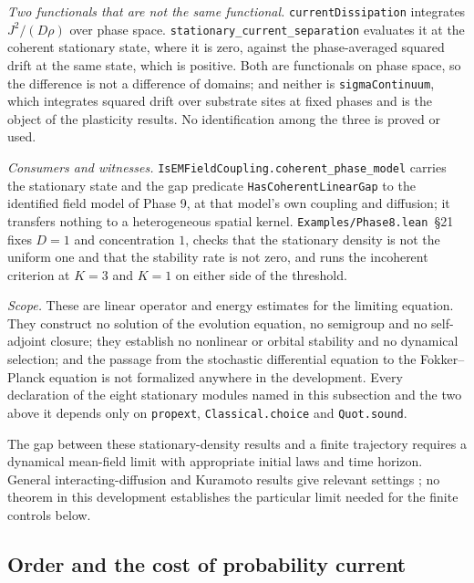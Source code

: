 \documentclass{article}
\renewcommand{\cite}[1]{\citep{#1}}
\begin{document}
\textit{Two functionals that are not the same functional.} \texttt{currentDissipation} integrates $J^{2}/(D\rho)$ over phase space. \nolinkurl{stationary_current_separation} evaluates it at the coherent stationary state, where it is zero, against the phase-averaged squared drift at the same state, which is positive. Both are functionals on phase space, so the difference is not a difference of domains; and neither is \texttt{sigmaContinuum}, which integrates squared drift over substrate sites at fixed phases and is the object of the plasticity results. No identification among the three is proved or used.

\textit{Consumers and witnesses.} \nolinkurl{IsEMFieldCoupling.coherent_phase_model} carries the stationary state and the gap predicate \texttt{HasCoherentLinearGap} to the identified field model of Phase 9, at that model's own coupling and diffusion; it transfers nothing to a heterogeneous spatial kernel. \nolinkurl{Examples/Phase8.lean}~\S21 fixes $D = 1$ and concentration $1$, checks that the stationary density is not the uniform one and that the stability rate is not zero, and runs the incoherent criterion at $K = 3$ and $K = 1$ on either side of the threshold.

\textit{Scope.} These are linear operator and energy estimates for the limiting equation. They construct no solution of the evolution equation, no semigroup and no self-adjoint closure; they establish no nonlinear or orbital stability and no dynamical selection; and the passage from the stochastic differential equation to the Fokker--Planck equation is not formalized anywhere in the development. Every declaration of the eight stationary modules named in this subsection and the two above it depends only on \texttt{propext}, \texttt{Classical.choice} and \texttt{Quot.sound}.

\noindent The gap between these stationary-density results and a finite trajectory requires a dynamical mean-field limit with appropriate initial laws and time horizon. General interacting-diffusion and Kuramoto results give relevant settings \cite{sznitman1991,daipra1996,bertini2010}; no theorem in this development establishes the particular limit needed for the finite controls below.

\subsection{Order and the cost of probability current}
\end{document}
